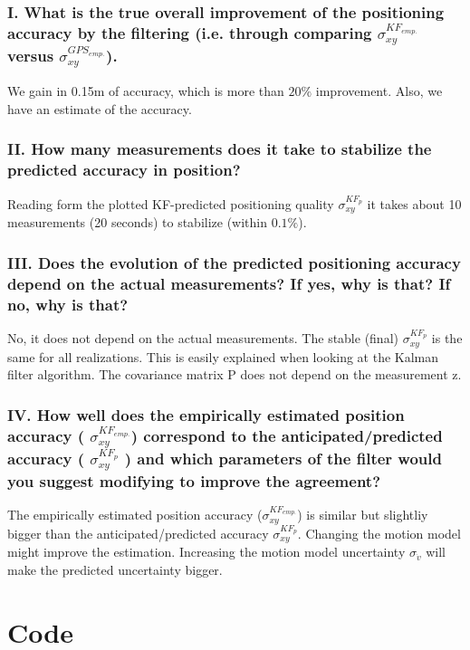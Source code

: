 \documentclass{article}
\begin{document}
\subsubsection*{I. What is the true overall improvement of the positioning accuracy by the filtering
(i.e. through comparing $\sigma_{xy}^{KF_{emp.}}$ versus $\sigma_{xy}^{GPS_{emp.}}$).}

We gain in 0.15m of accuracy, which is more than $20\%$ improvement.
Also, we have an estimate of the accuracy.

\subsubsection*{II. How many measurements does it take to stabilize the predicted accuracy in position?}

Reading form the plotted KF-predicted positioning quality $\sigma_{xy}^{KF_{p}}$ it takes about 10 measurements (20 seconds) to stabilize (within $0.1\%$).

\subsubsection*{III. Does the evolution of the predicted positioning accuracy depend on the actual measurements?
If yes, why is that? If no, why is that?}

No, it does not depend on the actual measurements.
The stable (final) $\sigma_{xy}^{KF_{p}}$ is the same for all realizations.
This is easily explained when looking at the Kalman filter algorithm.
The covariance matrix P does not depend on the measurement z.

\subsubsection*{IV. How well does the empirically estimated position accuracy ( $\sigma_{xy}^{KF_{emp.}}$)
correspond to the anticipated/predicted accuracy ( $\sigma_{xy}^{KF_p}$ ) and which parameters
of the filter would you suggest modifying to improve the agreement?}

The empirically estimated position accuracy ($\sigma_{xy}^{KF_{emp.}}$)
is similar but slightliy bigger than the anticipated/predicted accuracy
$\sigma_{xy}^{KF_p}$.
Changing the motion model might improve the estimation.
Increasing the motion model uncertainty $\sigma_{\dot{v}}$ will make the predicted uncertainty bigger.

\newpage
\section*{Code}

\end{document}
